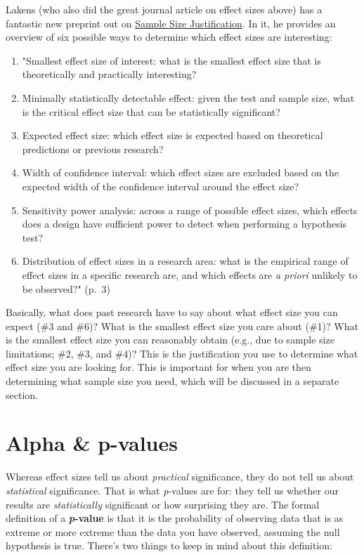 \documentclass[
]{book}
\providecommand{\tightlist}{%
  \setlength{\itemsep}{0pt}\setlength{\parskip}{0pt}}
\begin{document}
Lakens (who also did the great journal article on effect sizes above) has a fantastic new preprint out on \href{https://psyarxiv.com/9d3yf/}{Sample Size Justification}. In it, he provides an overview of six possible ways to determine which effect sizes are interesting:

\begin{enumerate}
\def\labelenumi{\arabic{enumi}.}
\tightlist
\item
  "Smallest effect size of interest: what is the smallest effect size that is theoretically and practically interesting?
\item
  Minimally statistically detectable effect: given the test and sample size, what is the critical effect size that can be statistically significant?
\item
  Expected effect size: which effect size is expected based on theoretical predictions or previous research?
\item
  Width of confidence interval: which effect sizes are excluded based on the expected width of the confidence interval around the effect size?
\item
  Sensitivity power analysis: across a range of possible effect sizes, which effects does a design have sufficient power to detect when performing a hypothesis test?
\item
  Distribution of effect sizes in a research area: what is the empirical range of effect sizes in a specific research are, and which effects are \emph{a priori} unlikely to be observed?" (p.~3)
\end{enumerate}

Basically, what does past research have to say about what effect size you can expect (\#3 and \#6)? What is the smallest effect size you care about (\#1)? What is the smallest effect size you can reasonably obtain (e.g., due to sample size limitations; \#2, \#3, and \#4)? This is the justification you use to determine what effect size you are looking for. This is important for when you are then determining what sample size you need, which will be discussed in a separate section.

\hypertarget{alpha-p-values}{%
\section{Alpha \& p-values}\label{alpha-p-values}}

Whereas effect sizes tell us about \emph{practical} significance, they do not tell us about \emph{statistical} significance. That is what \emph{p}-values are for: they tell us whether our results are \emph{statistically} significant or how surprising they are. The formal definition of a \textbf{\emph{p}-value} is that it is the probability of observing data that is as extreme or more extreme than the data you have observed, assuming the null hypothesis is true. There's two things to keep in mind about this definition:
\end{document}
